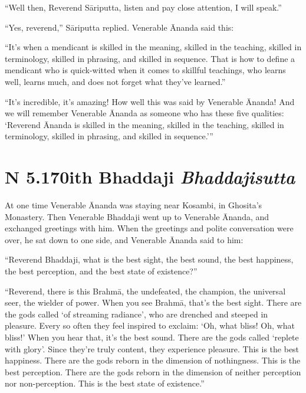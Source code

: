 \documentclass[12pt,openany]{book}%
\newcommand*{\suttatitleacronym}[1]{\smaller[2]{#1}\vspace*{.3em}}
\newcommand*{\suttatitletranslation}[1]{\linebreak{#1}}
\newcommand*{\suttatitleroot}[1]{\linebreak\smaller[2]\itshape{#1}}
\newcommand*{\tocacronym}[1]{\hspace*{-3.3em}{#1}\quad}
\newcommand*{\toctranslation}[1]{#1}
\newcommand*{\tocroot}[1]{(\textit{#1})}
\begin{document}
“Well then, Reverend \textsanskrit{Sāriputta}, listen and pay close attention, I will speak.” 

“Yes, reverend,” \textsanskrit{Sāriputta} replied. Venerable Ānanda said this: 

“It’s when a mendicant is skilled in the meaning, skilled in the teaching, skilled in terminology, skilled in phrasing, and skilled in sequence. That is how to define a mendicant who is quick-witted when it comes to skillful teachings, who learns well, learns much, and does not forget what they’ve learned.” 

“It’s incredible, it’s amazing! How well this was said by Venerable Ānanda! And we will remember Venerable Ānanda as someone who has these five qualities: ‘Reverend Ānanda is skilled in the meaning, skilled in the teaching, skilled in terminology, skilled in phrasing, and skilled in sequence.’” 

%
\section*{{\suttatitleacronym AN 5.170}{\suttatitletranslation With Bhaddaji }{\suttatitleroot Bhaddajisutta}}
\addcontentsline{toc}{section}{\tocacronym{AN 5.170} \toctranslation{With Bhaddaji } \tocroot{Bhaddajisutta}}

At one time Venerable Ānanda was staying near Kosambi, in Ghosita’s Monastery. Then Venerable Bhaddaji went up to Venerable Ānanda, and exchanged greetings with him. When the greetings and polite conversation were over, he sat down to one side, and Venerable Ānanda said to him: 

“Reverend Bhaddaji, what is the best sight, the best sound, the best happiness, the best perception, and the best state of existence?” 

“Reverend, there is this \textsanskrit{Brahmā}, the undefeated, the champion, the universal seer, the wielder of power. When you see \textsanskrit{Brahmā}, that’s the best sight. There are the gods called ‘of streaming radiance’, who are drenched and steeped in pleasure. Every so often they feel inspired to exclaim: ‘Oh, what bliss! Oh, what bliss!’ When you hear that, it’s the best sound. There are the gods called ‘replete with glory’. Since they’re truly content, they experience pleasure. This is the best happiness. There are the gods reborn in the dimension of nothingness. This is the best perception. There are the gods reborn in the dimension of neither perception nor non-perception. This is the best state of existence.” 
\end{document}
